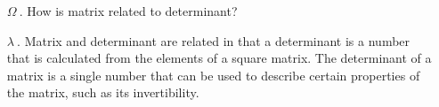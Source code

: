 \documentclass{article}
\begin{document}
\pagecolor{BLUE20}
\ttfamily
\sloppy
\vspace*{\fill}
\begin{itemize}
	\item[\textcolor{GREEN10}{$\Omega ~.$}]\textcolor{GREEN10}{How is matrix related to determinant?}

	\item[\textcolor{WHITE01}{$\lambda ~.$}]\textcolor{WHITE01}{Matrix and determinant are related in that a determinant is a number that is calculated from the elements of a square matrix. The determinant of a matrix is a single number that can be used to describe certain properties of the matrix, such as its invertibility.}
\end{itemize}
\vspace*{\fill}
\end{document}
